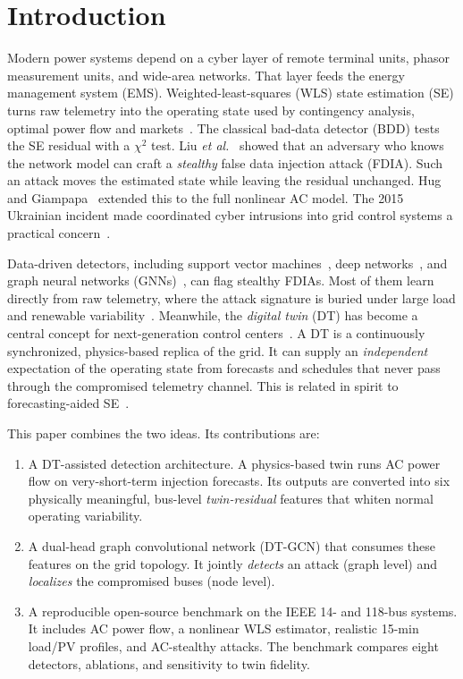 \section{Introduction}
Modern power systems depend on a cyber layer of remote terminal units, phasor measurement units, and wide-area networks. That layer feeds the energy management system (EMS). Weighted-least-squares (WLS) state estimation (SE) turns raw telemetry into the operating state used by contingency analysis, optimal power flow and markets~\cite{abur2004se}. The classical bad-data detector (BDD) tests the SE residual with a $\chi^2$ test. Liu \textit{et al.}~\cite{liu2009fdia} showed that an adversary who knows the network model can craft a \emph{stealthy} false data injection attack (FDIA). Such an attack moves the estimated state while leaving the residual unchanged. Hug and Giampapa~\cite{hug2012ac} extended this to the full nonlinear AC model. The 2015 Ukrainian incident made coordinated cyber intrusions into grid control systems a practical concern~\cite{liang2017ukraine}.

Data-driven detectors, including support vector machines~\cite{esmalifalak2017svm,ozay2016ml}, deep networks~\cite{he2017deep}, and graph neural networks (GNNs)~\cite{boyaci2022gnn,boyaci2022joint}, can flag stealthy FDIAs. Most of them learn directly from raw telemetry, where the attack signature is buried under large load and renewable variability~\cite{musleh2020survey}. Meanwhile, the \emph{digital twin} (DT) has become a central concept for next-generation control centers~\cite{tao2019dt,he2019dtpower}. A DT is a continuously synchronized, physics-based replica of the grid. It can supply an \emph{independent} expectation of the operating state from forecasts and schedules that never pass through the compromised telemetry channel. This is related in spirit to forecasting-aided SE~\cite{zhao2019dse}.

This paper combines the two ideas. Its contributions are:
\begin{enumerate}
\item A DT-assisted detection architecture. A physics-based twin runs AC power flow on very-short-term injection forecasts. Its outputs are converted into six physically meaningful, bus-level \emph{twin-residual} features that whiten normal operating variability.
\item A dual-head graph convolutional network (DT-GCN) that consumes these features on the grid topology. It jointly \emph{detects} an attack (graph level) and \emph{localizes} the compromised buses (node level).
\item A reproducible open-source benchmark on the IEEE 14- and 118-bus systems. It includes AC power flow, a nonlinear WLS estimator, realistic 15-min load/PV profiles, and AC-stealthy attacks. The benchmark compares eight detectors, ablations, and sensitivity to twin fidelity.
\end{enumerate}

